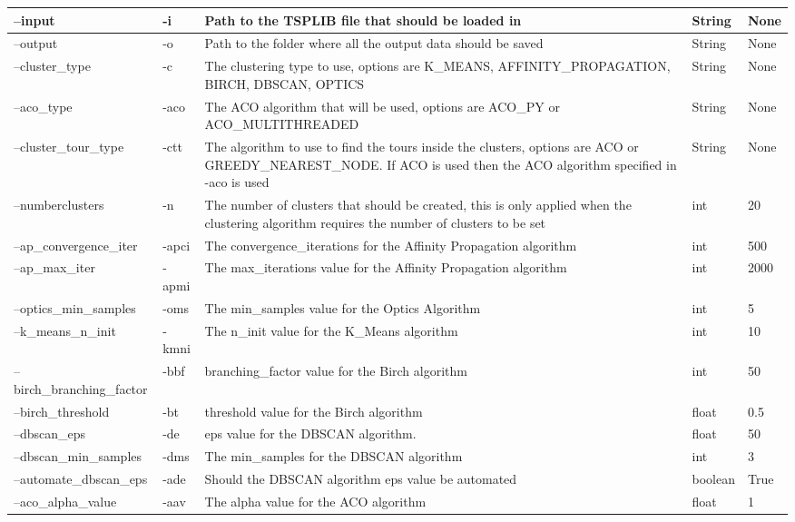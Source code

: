 \begin{center}
\begin{longtable}{|p{4cm}|p{1cm}|p{5cm}|p{1.5cm}|p{1cm}|}
--input &
  -i &
  Path to the TSPLIB file that should be loaded in &
  String &
  None \\ \hline
--output &
  -o &
  Path to the folder where all the output data should be saved &
  String &
  None \\ \hline
--cluster\_type &
  -c &
  The clustering type to use, options are K\_MEANS, AFFINITY\_PROPAGATION, BIRCH, DBSCAN, OPTICS &
  String &
  None \\ \hline
--aco\_type &
  -aco &
  The ACO algorithm that will be used, options are ACO\_PY or ACO\_MULTITHREADED &
  String &
  None \\ \hline
--cluster\_tour\_type &
  -ctt &
  The algorithm to use to find the tours inside the clusters, options are ACO or GREEDY\_NEAREST\_NODE.  If ACO is used then the ACO algorithm specified in -aco is used &
  String &
  None \\ \hline
--numberclusters &
  -n &
  The number of clusters that should be created, this is only applied when the clustering algorithm requires the number of clusters to be set &
  int &
  20 \\ \hline
--ap\_convergence\_iter &
  -apci &
  The convergence\_iterations for the Affinity Propagation algorithm &
  int &
  500 \\ \hline
--ap\_max\_iter &
  -apmi &
  The max\_iterations value for the Affinity Propagation algorithm &
  int &
  2000 \\ \hline
--optics\_min\_samples &
  -oms &
  The min\_samples value for the Optics Algorithm &
  int &
  5 \\ \hline
--k\_means\_n\_init &
  -kmni &
  The n\_init value for the K\_Means algorithm &
  int &
  10 \\ \hline
--birch\_branching\_factor &
  -bbf &
  branching\_factor value for the Birch algorithm &
  int &
  50 \\ \hline
--birch\_threshold &
  -bt &
  threshold value for the Birch algorithm &
  float &
  0.5 \\ \hline
--dbscan\_eps &
  -de &
  eps value for the DBSCAN algorithm. &
  float &
  50 \\ \hline
--dbscan\_min\_samples &
  -dms &
  The min\_samples for the DBSCAN algorithm &
  int &
  3 \\ \hline
--automate\_dbscan\_eps &
  -ade &
  Should the DBSCAN algorithm eps value be automated &
  boolean &
  True \\ \hline
--aco\_alpha\_value &
  -aav &
  The alpha value for the ACO algorithm &
  float &
  1 \\ \hline

\end{longtable}
\end{center}
